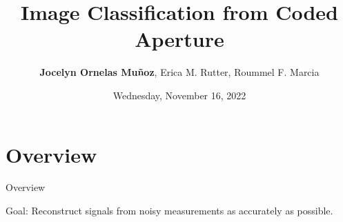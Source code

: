 \documentclass[10pt, t]{beamer}
\title[Coded Aperture]{Image Classification from Coded Aperture}
\author[J. Ornelas Mu\~noz]{\textbf{Jocelyn Ornelas Mu\~noz}, Erica M. Rutter,  Roummel F. Marcia}
\institute[]{\vspace{-4mm} \\ \normalsize{$^*$Department of Applied Mathematics, UC Merced\\
$^\dagger$ Department of Mathematics California State University, Fresno}\\ 	
	\vspace{2mm}
	\vspace{-3mm}
}
\date{Wednesday, November 16, 2022}
\begin{document}
\begin{frame}
  \titlepage
\end{frame}


%
%

\section{Overview}
\begin{frame}{Overview}


Goal: Reconstruct signals from noisy measurements as accurately as possible. 

\end{frame}
\end{document}
